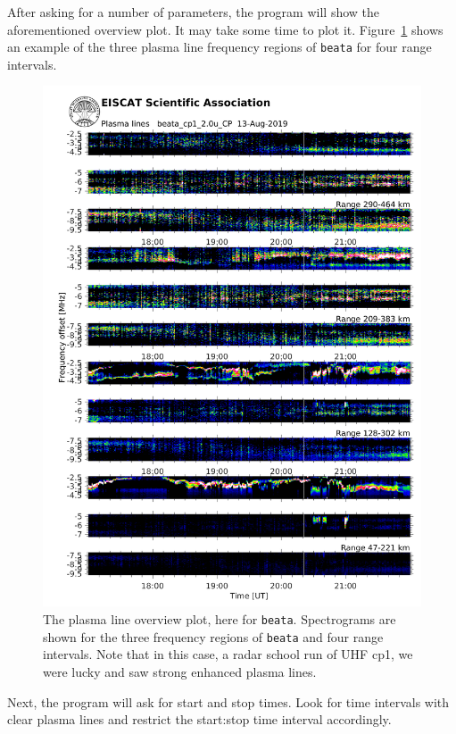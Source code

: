 \documentclass[a4]{article}
\begin{document}
After asking for a number of parameters, the program will show the
aforementioned overview plot. It may take some time to plot
it. Figure~\ref{fig:pl-overview} shows an example of the three plasma
line frequency regions of \texttt{beata} for four range intervals.

\begin{figure}
  \begin{center}
    \includegraphics[width=\linewidth]{pl_spec}
  \end{center}
  \caption{\label{fig:pl-overview}The plasma line overview plot, here for \texttt{beata}. Spectrograms
    are shown for the three frequency regions of \texttt{beata} and four range
    intervals. Note that in this case, a radar school run of UHF cp1,
    we were lucky and saw strong enhanced plasma lines.}
\end{figure}

Next, the program will ask for start and stop times.  Look for time
intervals with clear plasma lines and restrict the start:stop time
interval accordingly.
\end{document}
